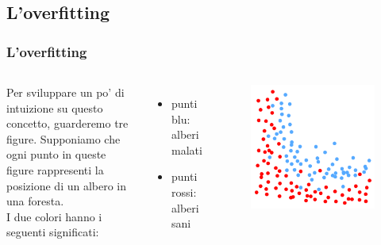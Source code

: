 \subsection[L'overfitting]{L'overfitting}

\begin{frame}

	\frametitle{L'overfitting}

	\begin{columns}

			Per sviluppare un po' di intuizione su questo concetto, guarderemo tre figure.
			\newlinedouble
			Supponiamo che ogni punto in queste figure rappresenti la posizione di un albero in una foresta.\\
			I due colori hanno i seguenti significati:
			\begin{itemize}
				\item punti blu: alberi malati
				\item punti rossi: alberi sani
			\end{itemize}

			\begin{figure}[!htbp]
				\centering
				\includegraphics[width=1.0\linewidth]{images/supervised/validation_test_training_peril_of_overfitting/overfitting.pdf}
			\end{figure}

	\end{columns}
\end{frame}

